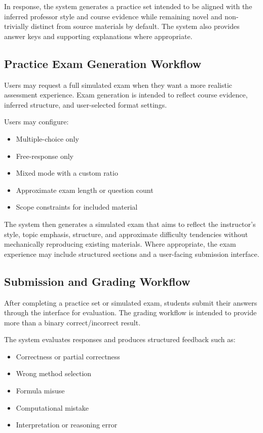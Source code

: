 \documentclass[11pt]{article}
\begin{document}
In response, the system generates a practice set intended to be aligned with the inferred professor style and course evidence while remaining novel and non-trivially distinct from source materials by default. The system also provides answer keys and supporting explanations where appropriate.

\subsection{Practice Exam Generation Workflow}
Users may request a full simulated exam when they want a more realistic assessment experience. Exam generation is intended to reflect course evidence, inferred structure, and user-selected format settings.

Users may configure:
\begin{itemize}
\item Multiple-choice only
\item Free-response only
\item Mixed mode with a custom ratio
\item Approximate exam length or question count
\item Scope constraints for included material
\end{itemize}

The system then generates a simulated exam that aims to reflect the instructor's style, topic emphasis, structure, and approximate difficulty tendencies without mechanically reproducing existing materials. Where appropriate, the exam experience may include structured sections and a user-facing submission interface.

\subsection{Submission and Grading Workflow}
After completing a practice set or simulated exam, students submit their answers through the interface for evaluation. The grading workflow is intended to provide more than a binary correct/incorrect result.

The system evaluates responses and produces structured feedback such as:
\begin{itemize}
\item Correctness or partial correctness
\item Wrong method selection
\item Formula misuse
\item Computational mistake
\item Interpretation or reasoning error
\end{itemize}
\end{document}
